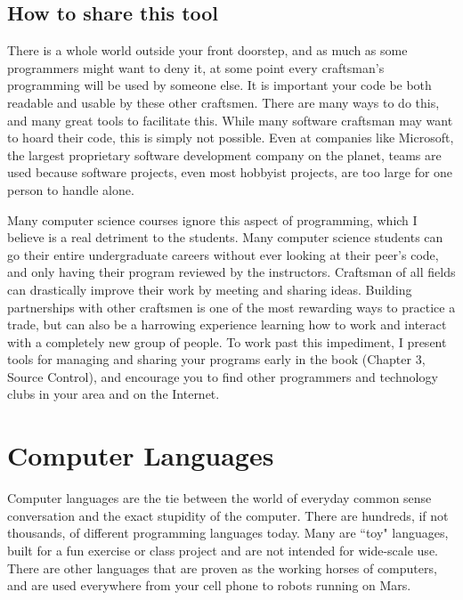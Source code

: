 \subsection{How to share this tool}

There is a whole world outside your front doorstep, and as much as some
programmers might want to deny it, at some point every craftsman's programming
will be used by someone else. It is important your code be both readable and
usable by these other craftsmen. There are many ways to do this, and many
great tools to facilitate this. While many software craftsman may want to
hoard their code, this is simply not possible. Even at companies like
Microsoft, the largest proprietary software development company on the planet,
teams are used because software projects, even most hobbyist projects, are too
large for one person to handle alone.

Many computer science courses ignore this aspect of programming, which I
believe is a real detriment to the students. Many computer science students
can go their entire undergraduate careers without ever looking at their peer's
code, and only having their program reviewed by the instructors. Craftsman of
all fields can drastically improve their work by meeting and sharing ideas.
Building partnerships with other craftsmen is one of the most rewarding ways
to practice a trade, but can also be a harrowing experience learning how to
work and interact with a completely new group of people. To work past this
impediment, I present tools for managing and sharing your programs early in
the book (Chapter 3, Source Control), and encourage you to find other
programmers and technology clubs in your area and on the Internet.


\section{Computer Languages}

Computer languages are the tie between the world of everyday common sense
conversation and the exact stupidity of the computer. There are hundreds, if
not thousands, of different programming languages today. Many are ``toy"
languages, built for a fun exercise or class project and are not intended for
wide-scale use. There are other languages that are proven as the working
horses of computers, and are used everywhere from your cell phone to robots
running on Mars.

